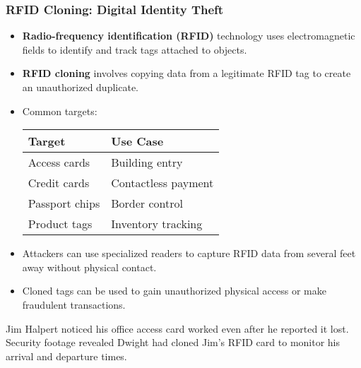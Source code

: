 \documentclass{beamer}
\begin{document}
\begin{frame}
    \frametitle{RFID Cloning: Digital Identity Theft}
    
    \begin{itemize}
        \item \textbf{Radio-frequency identification (RFID)} technology uses electromagnetic fields to identify and track tags attached to objects.
        \item \textbf{RFID cloning} involves copying data from a legitimate RFID tag to create an unauthorized duplicate.
        \item Common targets:
        
        \begin{tabular}{l|l}
            \textbf{Target} & \textbf{Use Case} \\
            \hline
            Access cards & Building entry \\
            Credit cards & Contactless payment \\
            Passport chips & Border control \\
            Product tags & Inventory tracking \\
        \end{tabular}
        
        \item Attackers can use specialized readers to capture RFID data from several feet away without physical contact.
        \item Cloned tags can be used to gain unauthorized physical access or make fraudulent transactions.
    \end{itemize}
    
    \begin{example}
        Jim Halpert noticed his office access card worked even after he reported it lost. Security footage revealed Dwight had cloned Jim's RFID card to monitor his arrival and departure times.
    \end{example}
\end{frame}
\end{document}
